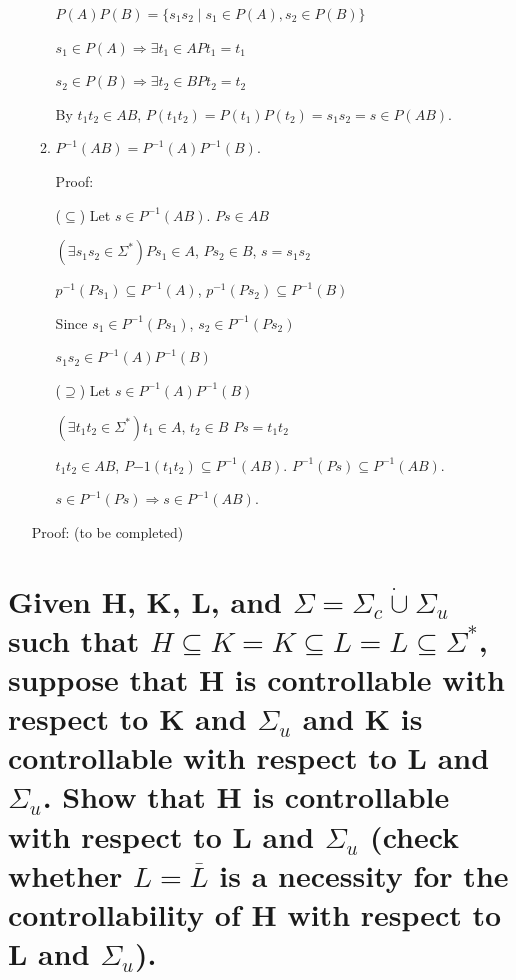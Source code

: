 \documentclass{article}
\begin{document}
\begin{enumerate}
\begin{enumerate}
    $P(A)P(B) = \{s_1s_2 \mid s_1 \in P(A), s_2 \in P(B)\}$

    $s_1 \in P(A) \Rightarrow \exists t_1 \in A Pt_1 = t_1$

    $s_2 \in P(B) \Rightarrow \exists t_2 \in B Pt_2 = t_2$

    By $t_1t_2 \in AB$, $P(t_1t_2) = P(t_1)P(t_2) = s_1s_2 = s \in P(AB)$.


    
    \item $P^{-1}(AB) = P^{-1}(A)P^{-1}(B)$.
    
    Proof:
    
    ($\subseteq$) Let $s \in P^{-1}(AB)$. $Ps \in AB$

    $(\exists s_1s_2 \in \Sigma^*) Ps_1 \in A$, $Ps_2 \in B$, $s = s_1s_2$

    $p^{-1}(Ps_1) \subseteq P^{-1}(A)$, $p^{-1}(Ps_2) \subseteq P^{-1}(B)$

    Since $s_1 \in P^{-1}(Ps_1)$, $s_2 \in P^{-1}(Ps_2)$

    $s_1s_2 \in P^{-1}(A)P^{-1}(B)$

    ($\supseteq$) Let $s \in P^{-1}(A)P^{-1}(B)$

    $(\exists t_1t_2 \in \Sigma^*) t_1 \in A$, $t_2 \in B$ $Ps=t_1t_2$

    $t_1t_2 \in AB$, $P{-1}(t_1t_2) \subseteq P^{-1}(AB)$. $P^{-1}(Ps) \subseteq P^{-1}(AB)$.

    $s \in P^{-1}(Ps) \Rightarrow s \in P^{-1}(AB)$.



    
  \end{enumerate}
  
  Proof: (to be completed)
\end{enumerate}

\section{Given H, K, L, and $\Sigma = \Sigma_c \dot{\cup} \Sigma_u$ such that $H \subseteq K = K \subseteq L = L \subseteq \Sigma^*$, suppose that H is controllable with respect to K and $\Sigma_u$ and K is controllable with respect to L and $\Sigma_u$. Show that H is controllable with respect to L and $\Sigma_u$ (check whether $L = \overline{L}$ is a necessity for the controllability of H with respect to L and $\Sigma_u$).}
\end{document}
